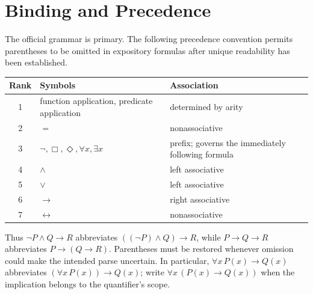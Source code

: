 \chapter{Binding and Precedence}
\label{ch:binding-precedence}
\label{app:precedence}

The official grammar is primary.  The following precedence convention permits
parentheses to be omitted in expository formulas after unique readability has
been established.

\begin{center}
\begin{tabularx}{\textwidth}{@{}c>{\raggedright\arraybackslash}p{}>{\raggedright\arraybackslash}X@{}}
\toprule
Rank & Symbols & Association \\
\midrule
1 & function application, predicate application & determined by arity \\
2 & \(=\) & nonassociative \\
3 & \(\neg,\Box,\Diamond,\forall x,\exists x\) & prefix; governs the immediately following formula \\
4 & \(\land\) & left associative \\
5 & \(\lor\) & left associative \\
6 & \(\to\) & right associative \\
7 & \(\leftrightarrow\) & nonassociative \\
\bottomrule
\end{tabularx}
\end{center}

Thus \(\neg P\land Q\to R\) abbreviates
\(((\neg P)\land Q)\to R\), while
\(P\to Q\to R\) abbreviates \(P\to(Q\to R)\).  Parentheses must be restored
whenever omission could make the intended parse uncertain.  In particular,
\(\forall x\,P(x)\to Q(x)\) abbreviates
\((\forall x\,P(x))\to Q(x)\); write
\(\forall x\,(P(x)\to Q(x))\) when the implication belongs to the
quantifier's scope.

